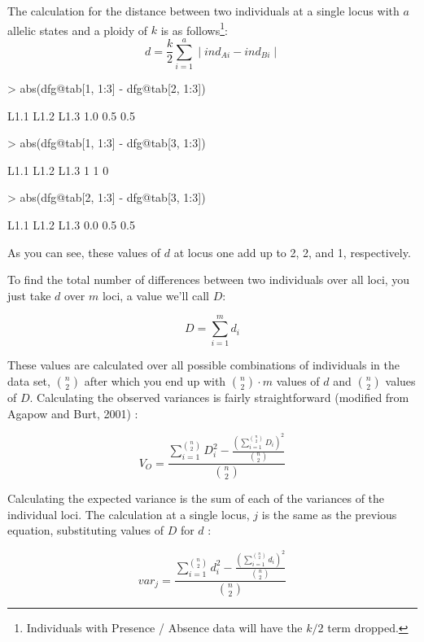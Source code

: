 \documentclass[letterpaper]{article}
\newcommand{\beq}{\begin{equation}}
\newcommand{\eeq}{\end{equation}}
\begin{document}
The calculation for the distance between two individuals at a single locus with $a$ allelic states and a ploidy of $k$ is as follows\footnote{Individuals with Presence / Absence data will have the $k/2$ term dropped.}:
\beq
\label{eq:ia_d}
d = \displaystyle \frac{k}{2}\sum_{i=1}^{a} \mid ind_{Ai} - ind_{Bi}\mid
\eeq
\begin{Schunk}
\begin{Sinput}
> abs(dfg@tab[1, 1:3] - dfg@tab[2, 1:3])
\end{Sinput}
\begin{Soutput}
L1.1 L1.2 L1.3 
 1.0  0.5  0.5 
\end{Soutput}
\begin{Sinput}
> abs(dfg@tab[1, 1:3] - dfg@tab[3, 1:3])
\end{Sinput}
\begin{Soutput}
L1.1 L1.2 L1.3 
   1    1    0 
\end{Soutput}
\begin{Sinput}
> abs(dfg@tab[2, 1:3] - dfg@tab[3, 1:3])
\end{Sinput}
\begin{Soutput}
L1.1 L1.2 L1.3 
 0.0  0.5  0.5 
\end{Soutput}
\end{Schunk}
As you can see, these values of $d$ at locus one add up to 2, 2, and 1, respectively.

To find the total number of differences between two individuals over all loci, you just take $d$ over $m$ loci, a value we'll call $D$:

\beq
\label{eq:ia_D}
D = \displaystyle \sum_{i=1}^{m} d_i
\eeq

These values are calculated over all possible combinations of individuals in the data set, ${n \choose 2}$ after which you end up with ${n \choose 2}\cdot{}m$ values of $d$ and ${n \choose 2}$ values of $D$.
Calculating the observed variances is fairly straightforward (modified from Agapow and Burt, 2001) \cite{Agapow:2001}:

\beq
\label{eq:V_O}
V_O = \frac{\displaystyle \sum_{i=1}^{n \choose 2} D_{i}^2 - \frac{(\displaystyle\sum_{i=1}^{n \choose 2} D_{i})^2}{{n \choose 2}}}{{n \choose 2}}
\eeq

Calculating the expected variance is the sum of each of the variances of the individual loci. The calculation at a single locus, $j$ is the same as the previous equation, substituting values of $D$ for $d$ \cite{Agapow:2001}:

\beq
\label{eq:var_j}
var_j = \frac{\displaystyle \sum_{i=1}^{n \choose 2} d_{i}^2 - \frac{(\displaystyle\sum_{i=1}^{n \choose 2} d_i)^2}{{n \choose 2}}}{{n \choose 2}}
\eeq
\end{document}

